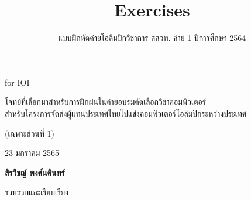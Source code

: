 \documentclass[12pt,a4paper]{report}
\title{Exercises}
\author{แบบฝึกหัดค่ายโอลิมปิกวิชาการ สสวท. ค่าย 1 ปีการศึกษา 2564}
\date{}
\begin{document}
\thispagestyle{titlepage}

\vspace*{\fill}

\begin{center}
{
    \noindent\sffamily
    {\Huge{} for IOI}
    
    \medskip
    
    โจทย์ที่เลือกมาสำหรับการฝึกฝนในค่ายอบรมคัดเลือกวิชาคอมพิวเตอร์\\
    สำหรับโครงการจัดส่งผู้แทนประเทศไทยไปแข่งคอมพิวเตอร์โอลิมปิกระหว่างประเทศ
    
    \bigskip
    
    (เฉพาะส่วนที่ 1)
    
    \vspace{2cm}
    
    23 มกราคม 2565
    
    \vspace{3cm}
    
    \textbf{สิรวิชญ์ พงศ์นคินทร์}
    
    รวบรวมและเรียบเรียง
}
\end{center}


\vspace*{\fill}

\newpage


\pagestyle{plain}
\fancyhead[R]{\sffamily {\leftmark}}












\end{document}
